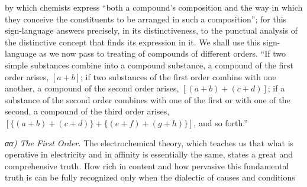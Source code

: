 \documentclass[12pt,a4paper]{book}
\begin{document}
by which chemists express ``both a compound's composition and the way in which
they conceive the constituents to be arranged in such a composition''; for this
sign-language answers precisely, in its distinctiveness, to the punctual
analysis of the distinctive concept that finds its expression in it. We shall
use this sign-language as we now pass to treating of compounds of different
orders. ``If two simple substances combine into a compound substance, a
compound of the first order arises, $[a + b]$; if two substances of the first
order combine with one another, a compound of the second order arises,
$[(a + b) + (c + d)]$; if a substance of the second order combines with one of
the first or with one of the second, a compound of the third order arises,
$[\{(a + b) + (c + d)\} + \{(e + f) + (g + h)\}]$, and so forth.''

\emph{αα) The First Order.} The electrochemical theory, which teaches us that
what is operative in electricity and in affinity is essentially the same,
states a great and comprehensive truth. How rich in content and how pervasive
this fundamental truth is can be fully recognized only when the dialectic of
causes and conditions
\end{document}
